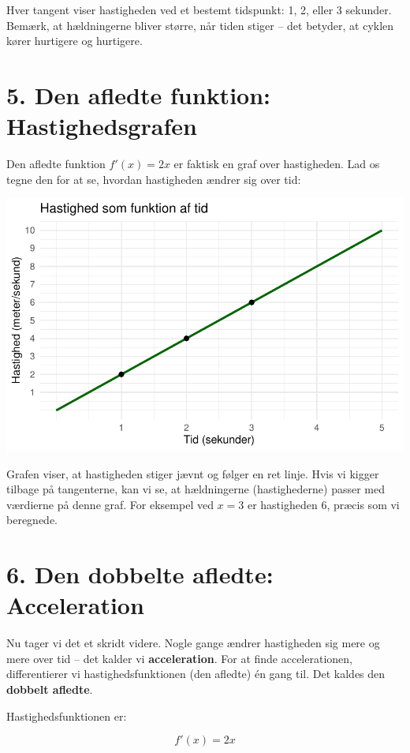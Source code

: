 \documentclass[
  letterpaper,
  DIV=11,
  numbers=noendperiod]{scrreprt}
\begin{document}
Hver tangent viser hastigheden ved et bestemt tidspunkt: 1, 2, eller 3
sekunder. Bemærk, at hældningerne bliver større, når tiden stiger -- det
betyder, at cyklen kører hurtigere og hurtigere.

\section{5. Den afledte funktion:
Hastighedsgrafen}\label{den-afledte-funktion-hastighedsgrafen}

Den afledte funktion \(f'(x) = 2x\) er faktisk en graf over hastigheden.
Lad os tegne den for at se, hvordan hastigheden ændrer sig over tid:

\includegraphics{differentialregning_files/figure-pdf/plot-afledte-1.pdf}

Grafen viser, at hastigheden stiger jævnt og følger en ret linje. Hvis
vi kigger tilbage på tangenterne, kan vi se, at hældningerne
(hastighederne) passer med værdierne på denne graf. For eksempel ved
\(x = 3\) er hastigheden 6, præcis som vi beregnede.

\section{6. Den dobbelte afledte:
Acceleration}\label{den-dobbelte-afledte-acceleration}

Nu tager vi det et skridt videre. Nogle gange ændrer hastigheden sig
mere og mere over tid -- det kalder vi \textbf{acceleration}. For at
finde accelerationen, differentierer vi hastighedsfunktionen (den
afledte) én gang til. Det kaldes den \textbf{dobbelt afledte}.

Hastighedsfunktionen er:

\[f'(x) = 2x\]
\end{document}
